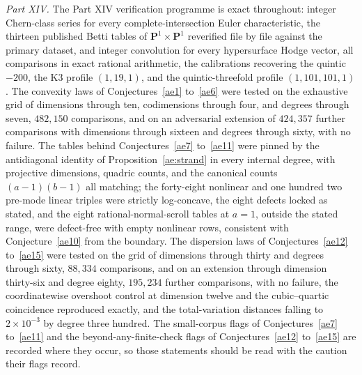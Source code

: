 \documentclass[11pt]{article}
\theoremstyle{definition}
\begin{document}
\emph{Part XIV.}  The Part XIV verification programme is exact throughout: integer Chern-class series for every complete-intersection Euler characteristic, the thirteen published Betti tables of $\mathbf P^1\times\mathbf P^1$ reverified file by file against the primary dataset, and integer convolution for every hypersurface Hodge vector, all comparisons in exact rational arithmetic, the calibrations recovering the quintic $-200$, the K3 profile $(1,19,1)$, and the quintic-threefold profile $(1,101,101,1)$.  The convexity laws of Conjectures~\ref{ae1} to~\ref{ae6} were tested on the exhaustive grid of dimensions through ten, codimensions through four, and degrees through seven, $482{,}150$ comparisons, and on an adversarial extension of $424{,}357$ further comparisons with dimensions through sixteen and degrees through sixty, with no failure.  The tables behind Conjectures~\ref{ae7} to~\ref{ae11} were pinned by the antidiagonal identity of Proposition~\ref{ae:strand} in every internal degree, with projective dimensions, quadric counts, and the canonical counts $(a-1)(b-1)$ all matching; the forty-eight nonlinear and one hundred two pre-mode linear triples were strictly log-concave, the eight defects locked as stated, and the eight rational-normal-scroll tables at $a=1$, outside the stated range, were defect-free with empty nonlinear rows, consistent with Conjecture~\ref{ae10} from the boundary.  The dispersion laws of Conjectures~\ref{ae12} to~\ref{ae15} were tested on the grid of dimensions through thirty and degrees through sixty, $88{,}334$ comparisons, and on an extension through dimension thirty-six and degree eighty, $195{,}234$ further comparisons, with no failure, the coordinatewise overshoot control at dimension twelve and the cubic--quartic coincidence reproduced exactly, and the total-variation distances falling to $2\times10^{-3}$ by degree three hundred.  The small-corpus flags of Conjectures~\ref{ae7} to~\ref{ae11} and the beyond-any-finite-check flags of Conjectures~\ref{ae12} to~\ref{ae15} are recorded where they occur, so those statements should be read with the caution their flags record.
\end{document}
